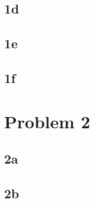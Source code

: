 \documentclass{article}
\begin{document}



\subsection*{1d}
\subsection*{1e}
\subsection*{1f}
\section*{Problem 2}
\subsection*{2a}
\subsection*{2b}
\end{document}
